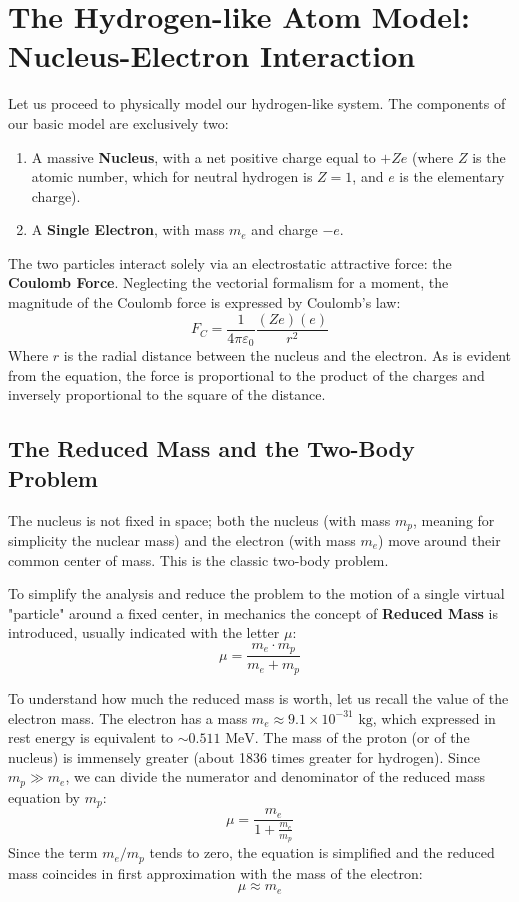 \section{The Hydrogen-like Atom Model: Nucleus-Electron Interaction}

Let us proceed to physically model our hydrogen-like system.
The components of our basic model are exclusively two:
\begin{enumerate}
\item A massive \textbf{Nucleus}, with a net positive charge equal to $+Z e$ (where $Z$ is the atomic number, which for neutral hydrogen is $Z=1$, and $e$ is the elementary charge).
\item A \textbf{Single Electron}, with mass $m_e$ and charge $-e$.
\end{enumerate}

The two particles interact solely via an electrostatic attractive force: the \textbf{Coulomb Force}. Neglecting the vectorial formalism for a moment, the magnitude of the Coulomb force is expressed by Coulomb's law:
\begin{equation}
F_C = \frac{1}{4\pi\varepsilon_0} \frac{(Ze)(e)}{r^2}
\end{equation}
Where $r$ is the radial distance between the nucleus and the electron. As is evident from the equation, the force is proportional to the product of the charges and inversely proportional to the square of the distance.

\subsection{The Reduced Mass and the Two-Body Problem}

The nucleus is not fixed in space; both the nucleus (with mass $m_p$, meaning for simplicity the nuclear mass) and the electron (with mass $m_e$) move around their common center of mass. This is the classic two-body problem.

To simplify the analysis and reduce the problem to the motion of a single virtual "particle" around a fixed center, in mechanics the concept of \textbf{Reduced Mass} is introduced, usually indicated with the letter $\mu$:
\begin{equation}
\mu = \frac{m_e \cdot m_p}{m_e + m_p}
\end{equation}

To understand how much the reduced mass is worth, let us recall the value of the electron mass. The electron has a mass $m_e \approx 9.1 \times 10^{-31} \text{ kg}$, which expressed in rest energy is equivalent to $\sim 0.511 \text{ MeV}$. The mass of the proton (or of the nucleus) is immensely greater (about 1836 times greater for hydrogen).
Since $m_p \gg m_e$, we can divide the numerator and denominator of the reduced mass equation by $m_p$:
\begin{equation}
\mu = \frac{m_e}{1 + \frac{m_e}{m_p}}
\end{equation}
Since the term $m_e/m_p$ tends to zero, the equation is simplified and the reduced mass coincides in first approximation with the mass of the electron:
\begin{equation}
\mu \approx m_e
\end{equation}

